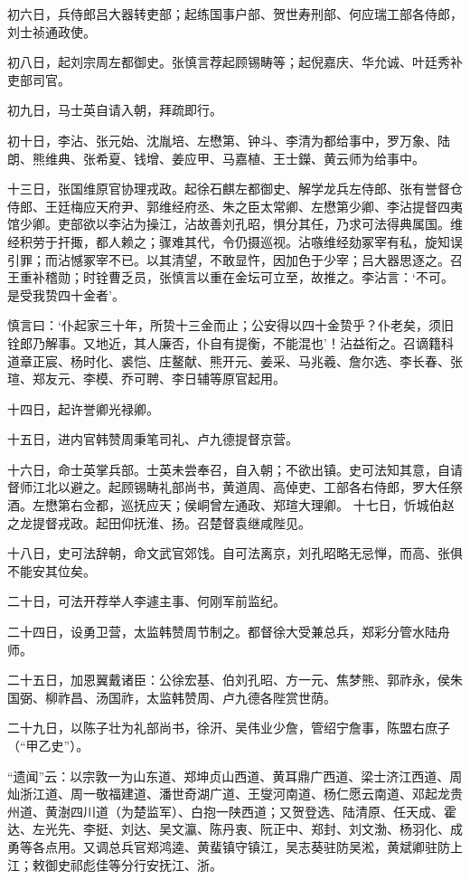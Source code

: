 \documentclass[]{article}
\begin{document}
初六日，兵侍郎吕大器转吏部；起练国事户部、贺世寿刑部、何应瑞工部各侍郎，刘士祯通政使。

初八日，起刘宗周左都御史。张慎言荐起顾锡畴等；起倪嘉庆、华允诚、叶廷秀补吏部司官。

初九日，马士英自请入朝，拜疏即行。

初十日，李沾、张元始、沈胤培、左懋第、钟斗、李清为都给事中，罗万象、陆朗、熊维典、张希夏、钱增、姜应甲、马嘉植、王士鑅、黄云师为给事中。

十三日，张国维原官协理戎政。起徐石麒左都御史、解学龙兵左侍郎、张有誉督仓侍郎、王廷梅应天府尹、郭维经府丞、朱之臣太常卿、左懋第少卿、李沾提督四夷馆少卿。吏部欲以李沾为操江，沾故善刘孔昭，惧分其任，乃求可法得典属国。维经积劳于扞掫，都人赖之；骤难其代，令仍摄巡视。沾嗾维经劾冢宰有私，旋知误引罪；而沾憾冢宰不已。以其清望，不敢显忤，因加色于少宰；吕大器思逐之。召王重补稽勋；时铨曹乏员，张慎言以重在金坛可立至，故推之。李沾言：`不可。是受我贽四十金者'。

慎言曰：`仆起家三十年，所贽十三金而止；公安得以四十金贽乎？仆老矣，须旧铨郎乃解事。又地近，其人廉否，仆自有提衡，不能混也'！沾益衔之。召谪籍科道章正宸、杨时化、裘恺、庄鳌献、熊开元、姜采、马兆羲、詹尔选、李长春、张瑄、郑友元、李模、乔可聘、李日辅等原官起用。

十四日，起许誉卿光禄卿。

十五日，进内官韩赞周秉笔司礼、卢九德提督京营。

十六日，命士英掌兵部。士英未尝奉召，自入朝；不欲出镇。史可法知其意，自请督师江北以避之。起顾锡畴礼部尚书，黄道周、高倬吏、工部各右侍郎，罗大任祭酒。左懋第右佥都，巡抚应天；侯峒曾左通政、郑瑄大理卿。
十七日，忻城伯赵之龙提督戎政。起田仰抚淮、扬。召楚督袁继咸陛见。

十八日，史可法辞朝，命文武官郊饯。自可法离京，刘孔昭略无忌惮，而高、张俱不能安其位矣。

二十日，可法开荐举人李遽主事、何刚军前监纪。

二十四日，设勇卫营，太监韩赞周节制之。都督徐大受兼总兵，郑彩分管水陆舟师。

二十五日，加恩翼戴诸臣：公徐宏基、伯刘孔昭、方一元、焦梦熊、郭祚永，侯朱国弼、柳祚昌、汤国祚，太监韩赞周、卢九德各陛赏世荫。

二十九日，以陈子壮为礼部尚书，徐汧、吴伟业少詹，管绍宁詹事，陈盟右庶子（``甲乙史''）。

``遗闻''云：以宗敦一为山东道、郑坤贞山西道、黄耳鼎广西道、梁士济江西道、周灿浙江道、周一敬福建道、潘世奇湖广道、王燮河南道、杨仁愿云南道、邓起龙贵州道、黄澍四川道（为楚监军）、白抱一陕西道；又贺登选、陆清原、任天成、霍达、左光先、李挺、刘达、吴文瀛、陈丹衷、阮正中、郑封、刘文渤、杨羽化、成勇等各点用。又调总兵官郑鸿逵、黄蜚镇守镇江，吴志葵驻防吴淞，黄斌卿驻防上江；敕御史祁彪佳等分行安抚江、浙。
\end{document}
